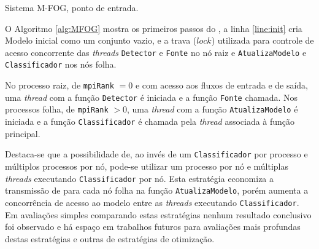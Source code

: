 

\begin{algorithm}[htb]
    
    \KwParams{\mpiRank, \mpiSize}
\caption{Sistema M-FOG, ponto de entrada.}
\label{alg:MFOG}
\end{algorithm}

O Algoritmo \ref{alg:MFOG} mostra os primeiros passos do \mfog, a
linha \ref{line:init} cria Modelo inicial como um conjunto vazio, e a trava
($lock$) utilizada para controle de acesso concorrente das \emph{threads}
\texttt{Detector} e \texttt{Fonte} no nó raiz e \texttt{AtualizaModelo} e
\texttt{Classificador} nos nós folha.

No processo raiz, de \texttt{mpiRank} $= 0$ e com acesso aos fluxos de entrada e
de saída, uma \emph{thread} com a função \texttt{Detector} é iniciada e a função
\texttt{Fonte} chamada.
Nos processos folha, de \texttt{mpiRank} $> 0$, uma \emph{thread} com a função
\texttt{AtualizaModelo} é iniciada e a função \texttt{Classificador} é chamada
pela \emph{thread} associada à função principal.

Destaca-se que a possibilidade de, ao invés de um \texttt{Classificador} por
processo e múltiplos processos por nó, pode-se utilizar um processo por nó
e múltiplas \emph{threads} executando \texttt{Classificador} por nó.
Esta estratégia economiza a transmissão de \mclusters para cada nó folha na
função \texttt{AtualizaModelo}, porém aumenta a concorrência de acesso ao modelo
entre as \emph{threads} executando \texttt{Classificador}.
Em avaliações simples comparando estas estratégias nenhum resultado conclusivo
foi observado e há espaço em trabalhos futuros para avaliações mais profundas
destas estratégias e outras de estratégias de otimização.


